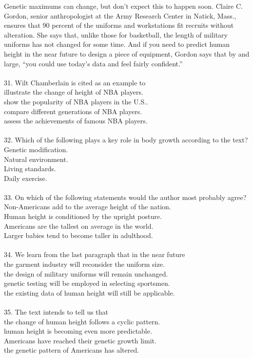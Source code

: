 \documentclass[a4paper]{ctexart}
\begin{document}
\par
Genetic maximums can change, but don’t expect this to happen soon. Claire C. Gordon, senior anthropologist at the Army Research Center in Natick, Mass., ensures that 90 percent of the uniforms and workstations fit recruits without alteration. She says that, unlike those for basketball, the length of military uniforms has not changed for some time. And if you need to predict human height in the near future to design a piece of equipment, Gordon says that by and large, “you could use today’s data and feel fairly confident.”
\\\\
31.	Wilt Chamberlain is cited as an example to\\
[A] illustrate the change of height of NBA players.\\
[B] show the popularity of NBA players in the U.S..\\
[C] compare different generations of NBA players.\\
[D] assess the achievements of famous NBA players.\\
\\
32.	Which of the following plays a key role in body growth according to the text?\\
[A] Genetic modification.\\
[B] Natural environment.\\
[C] Living standards.\\
[D] Daily exercise.\\
\\
33.	On which of the following statements would the author most probably agree?\\
[A] Non-Americans add to the average height of the nation.\\
[B] Human height is conditioned by the upright posture.\\
[C] Americans are the tallest on average in the world.\\
[D] Larger babies tend to become taller in adulthood.\\
\\
34.	We learn from the last paragraph that in the near future\\
[A] the garment industry will reconsider the uniform size.\\
[B] the design of military uniforms will remain unchanged.\\
[C] genetic testing will be employed in selecting sportsmen.\\
[D] the existing data of human height will still be applicable.\\
\\
35.	The text intends to tell us that\\
[A] the change of human height follows a cyclic pattern.\\
[B] human height is becoming even more predictable.\\
[C] Americans have reached their genetic growth limit.\\
[D] the genetic pattern of Americans has altered.\\
\end{document}
